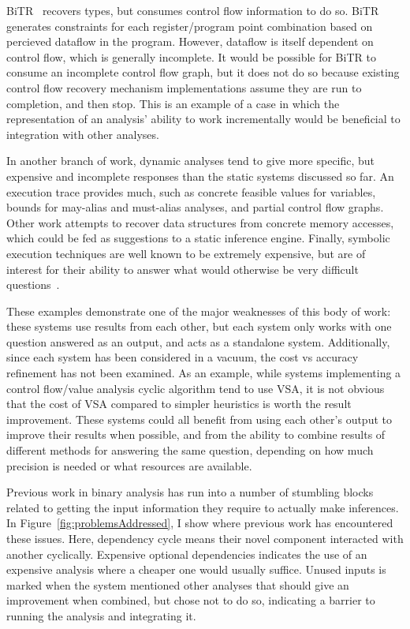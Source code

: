BiTR~\cite{bitr} recovers types, but consumes control flow information to do so.
BiTR generates constraints for each register/program point combination based on percieved dataflow in the program.
However, dataflow is itself dependent on control flow, which is generally incomplete.
It would be possible for BiTR to consume an incomplete control flow graph, but it does not do so because existing control flow recovery mechanism implementations assume they are run to completion, and then stop.
This is an example of a case in which the representation of an analysis' ability to work incrementally would be beneficial to integration with other analyses.

In another branch of work, dynamic analyses tend to give more specific, but expensive and incomplete responses than the static systems discussed so far.
An execution trace provides much, such as concrete feasible values for variables, bounds for may-alias and must-alias analyses, and partial control flow graphs.
Other work attempts to recover data structures from concrete memory accesses, which could be fed as suggestions to a static inference engine.
Finally, symbolic execution techniques are well known to be extremely expensive, but are of interest for their ability to answer what would otherwise be very difficult questions~\cite{mayhem}.

These examples demonstrate one of the major weaknesses of this body of work: these systems use results from each other, but each system only works with one question answered as an output, and acts as a standalone system.
Additionally, since each system has been considered in a vacuum, the cost vs accuracy refinement has not been examined.
As an example, while systems implementing a control flow/value analysis cyclic algorithm tend to use VSA, it is not obvious that the cost of VSA compared to simpler heuristics is worth the result improvement.
These systems could all benefit from using each other's output to improve their results when possible, and from the ability to combine results of different methods for answering the same question, depending on how much precision is needed or what resources are available.

Previous work in binary analysis has run into a number of stumbling blocks related to getting the input information they require to actually make inferences. 
In Figure~\ref{fig:problemsAddressed}, I show where previous work has encountered these issues.
Here, dependency cycle means their novel component interacted with another cyclically.
Expensive optional dependencies indicates the use of an expensive analysis where a cheaper one would usually suffice.
Unused inputs is marked when the system mentioned other analyses that should give an improvement when combined, but chose not to do so, indicating a barrier to running the analysis and integrating it.

